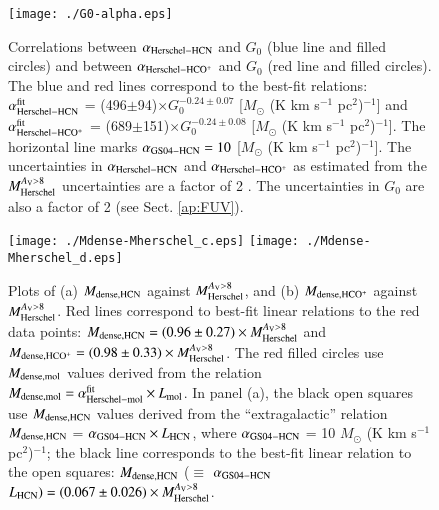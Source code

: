 \documentclass{aa}
\begin{document}
{%

\begin{figure}
\begin{center}
\texttt{[image: ./G0-alpha.eps]}
\caption{Correlations between $\alpha_{\rm Herschel-HCN}$ and $G_0$ (blue line and filled circles) and 
between $\alpha_{\rm Herschel-HCO^+}$ and $G_0$ (red line and filled circles).  
The blue and red lines correspond to the best-fit relations: 
$\alpha_{\rm Herschel-HCN}^{\rm fit}$ = (496$\pm$94)$\times$$G_0^{-0.24\pm0.07}$ [$M_{\odot}$  (K km s$^{-1}$ pc$^{2}$)$^{-1}$] 
and $\alpha_{\rm Herschel-HCO^+}^{\rm fit}$ = (689$\pm$151)$\times$$G_0^{-0.24\pm0.08}$ [$M_{\odot}$  (K km s$^{-1}$ pc$^{2}$)$^{-1}$].  
{The horizontal line marks $\alpha_{\rm GS04-HCN}=10$ [$M_{\odot}$  (K km s$^{-1}$ pc$^{2}$)$^{-1}$].}
The uncertainties in $\alpha_{\rm Herschel-HCN}$ and $\alpha_{\rm Herschel-HCO^+}$ as estimated from the $M_{\rm Herschel}^{A_{\rm V}>8}$ uncertainties 
are a factor of 2 \citep{Roy14}. The uncertainties in $G_0$ are also a factor of 2 (see Sect. \ref{ap:FUV}).
}
\label{fig_alpha-G0}
\end{center}
\end{figure}


\begin{figure}
\begin{center}
\texttt{[image: ./Mdense-Mherschel\_c.eps]} 
\texttt{[image: ./Mdense-Mherschel\_d.eps]} 
\caption{Plots of  (a) $M_{\rm dense,HCN}$ against $M_{\rm Herschel}^{A_{\rm V}>8}$, and (b) $M_{\rm dense,HCO^+}$ against $M_{\rm Herschel}^{A_{\rm V}>8}$. 
Red lines correspond to best-fit linear relations to the red data points: 
{$M_{\rm dense,HCN} = (0.96\pm0.27) \times M_{\rm Herschel}^{A_{\rm V}>8}$ and  $M_{\rm dense,HCO^+} = (0.98\pm0.33) \times M_{\rm Herschel}^{A_{\rm V}>8}$.} 
The red filled circles use $M_{\rm dense,mol}$ values derived from the relation $M_{\rm dense,mol} = \alpha_{\rm Herschel-mol}^{\rm fit} \times L_{\rm mol}$. 
In panel (a), the black open squares use $M_{\rm dense, HCN}$ values derived from the ``extragalactic'' 
relation $M_{\rm dense,HCN}$ = $\alpha_{\rm GS04-HCN} \times L_{\rm HCN}$, where $\alpha_{\rm GS04-HCN}$ = 10 $M_{\odot}$  (K km s$^{-1}$ pc$^{2}$)$^{-1}$; 
the black line corresponds to the best-fit linear relation to the open squares: 
$M_{\rm dense,HCN}$ ($\equiv$ $\alpha_{\rm GS04-HCN}$ $L_{\rm HCN}) = (0.067\pm0.026) \times M_{\rm Herschel}^{A_{\rm V}>8}$.} 
\label{Fig-Mvir_Mherschel2}
\end{center}
\end{figure}


}
\end{document}
